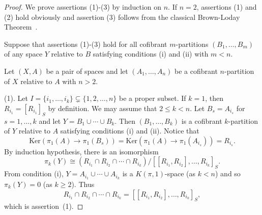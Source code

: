 \documentclass[10pt]{amsart}
\numberwithin{equation}{section}
\begin{document}
\begin{proof}
We prove assertions (1)-(3) by induction on $n$. If $n=2$, assertions (1) and (2) hold obviously and assertion (3) follows from the classical Brown-Loday Theorem~\cite{BL}.

 Suppose that assertions (1)-(3) hold for all cofibrant $m$-partitions $(B_1,\ldots,B_m)$ of any space $Y$ relative to $B$ satisfying conditions (i) and (ii) with $m<n$.

Let $(X,A)$ be a pair of spaces and let $(A_1,\ldots,A_n)$ be a cofibrant $n$-partition of $X$ relative to $A$ with $n>2$.

(1). Let $I=\{i_1,\ldots,i_k\}\subsetneq \{1,2,\ldots,n\}$ be a proper subset. If $k=1$, then $R_{i_1}=[R_{i_1}]_S$ by definition. We may assume that $2\leq k<n$. Let $B_s=A_{i_s}$ for $s=1,\ldots, k$ and let $Y=B_1\cup\cdots\cup B_{k}$. Then $(B_1,\ldots,B_k)$ is a cofibrant $k$-partition of $Y$ relative to $A$ satisfying conditions (i) and (ii). Notice that
$$
{\mathrm{K er}}(\pi_1(A)\to \pi_1(B_s))={\mathrm{K er}}(\pi_1(A)\to \pi_1(A_{i_s}))=R_{i_s}.
$$
By induction hypothesis, there is an isomorphism
$$
\pi_k(Y)\cong (R_{i_1}\cap R_{i_2}\cap \cdots\cap R_{i_k})/[[R_{i_1},R_{i_2}],\ldots,R_{i_k}]_S.
$$
From condition (i), $Y=A_{i_1}\cup\cdots\cup A_{i_k}$ is a $K(\pi,1)$-space (as $k<n$) and so $\pi_k(Y)=0$ (as $k\geq2$). Thus
$$
R_{i_1}\cap R_{i_2}\cap \cdots\cap R_{i_k}=[[R_{i_1},R_{i_2}],\ldots,R_{i_k}]_S,
$$
which is assertion~(1).


\end{proof}
\end{document}
